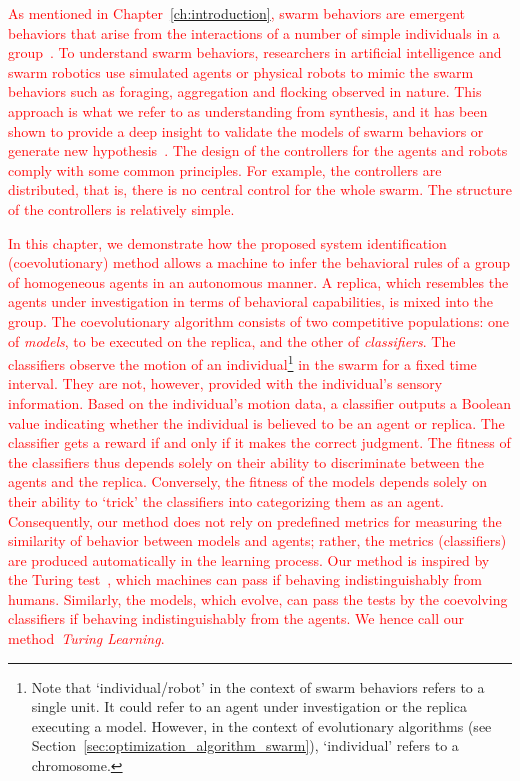 \textcolor{red}{As mentioned in Chapter~\ref{ch:introduction}, swarm behaviors are emergent behaviors that arise from the interactions of a number of simple individuals in a group~\cite{Camazine2001}. To understand swarm behaviors, researchers in artificial intelligence and swarm robotics use simulated agents or physical robots to mimic the swarm behaviors such as foraging, aggregation and flocking observed in nature. This approach is what we refer to as understanding from synthesis, and it has been shown to provide a deep insight to validate the models of swarm behaviors or generate new hypothesis~\cite{J.Halloy2007}. The design of the controllers for the agents and robots comply with some common principles. For example, the controllers are distributed, that is, there is no central control for the whole swarm. The structure of the controllers is relatively simple.} 

\textcolor{red}{In this chapter, we demonstrate how the proposed system identification (coevolutionary) method allows a machine to infer the behavioral rules of a group of homogeneous agents in an autonomous manner. A replica, which resembles the agents under investigation in terms of behavioral capabilities, is mixed into the group. The coevolutionary algorithm consists of two competitive populations: one of \textit{models}, to be executed on the replica, and the other of \textit{classifiers}. The classifiers observe the motion of an individual\footnote{Note that `individual/robot' in the context of swarm behaviors refers to a single unit. It could refer to an agent under investigation or the replica executing a model. However, in the context of evolutionary algorithms (see Section~\ref{sec:optimization_algorithm_swarm}), `individual' refers to a chromosome.} in the swarm for a fixed time interval. They are not, however, provided with the individual's sensory information. Based on the individual's motion data, a classifier outputs a Boolean value indicating whether the individual is believed to be an agent or replica. The classifier gets a reward if and only if it makes the correct judgment. The fitness of the classifiers thus depends solely on their ability to discriminate between the agents and the replica. Conversely, the fitness of the models depends solely on their ability to `trick' the classifiers into categorizing them as an agent. Consequently, our method does not rely on predefined metrics for measuring the similarity of behavior between models and agents; rather, the metrics (classifiers) are produced automatically in the learning process. Our method is inspired by the Turing test~\cite{Turing1950, Harnad2000}, which machines can pass if behaving indistinguishably from humans. Similarly, the models, which evolve, can pass the tests by the coevolving classifiers if behaving indistinguishably from the agents. We hence call our method~\textit{Turing Learning}.}

